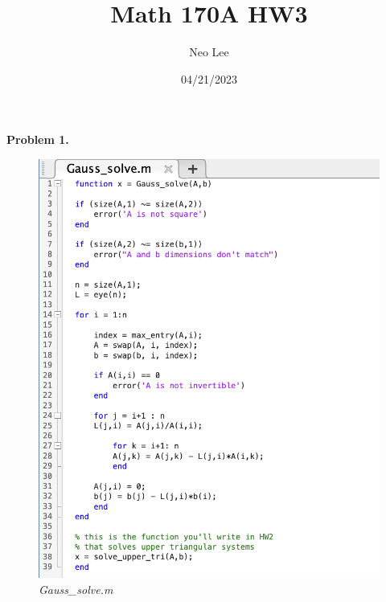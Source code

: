 \documentclass{article}
\title{Math 170A HW3}
\author{Neo Lee}
\date{04/21/2023}
\begin{document}
 

\maketitle 
\textbf{Problem 1.}
\begin{figure}[h]
    \centering
    \includegraphics*[scale=0.5]{Gauss_solve.png}
    \caption{\emph{Gauss\_solve.m}}
\end{figure}
\bigbreak
\end{document}
